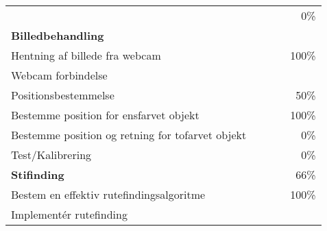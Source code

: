 \begin{footnotesize}
\begin{center}
\begin{tabular}{l | l | r r r}
																&		&		& 		& 0\%\\				
	\hspace*{0.3cm}\hspace*{0.3cm} \textbf{Billedbehandling}
																&		&		& 		& \\
	\hspace*{0.3cm}\hspace*{0.3cm}\hspace*{0.3cm} Hentning af billede fra webcam
																&		&		& 		&100\% \\	
	\hspace*{0.3cm}\hspace*{0.3cm}\hspace*{0.3cm} Webcam forbindelse
																&		&		& 		& \\
	\hspace*{0.3cm}\hspace*{0.3cm}\hspace*{0.3cm} Positionsbestemmelse
																&		&		& 		&50\% \\
	\hspace*{0.3cm}\hspace*{0.3cm}\hspace*{0.3cm}\hspace*{0.3cm} Bestemme position for ensfarvet objekt
																&		&		& 		&100\% \\
	\hspace*{0.3cm}\hspace*{0.3cm}\hspace*{0.3cm}\hspace*{0.3cm} Bestemme position og retning for tofarvet objekt
																&		&		& 		&0\% \\
	\hspace*{0.3cm}\hspace*{0.3cm}\hspace*{0.3cm} Test/Kalibrering
																&		&		& 		&0\% \\
	\hspace*{0.3cm}\hspace*{0.3cm} \textbf{Stifinding}
																&		&		& 		&66\% \\
	\hspace*{0.3cm}\hspace*{0.3cm}\hspace*{0.3cm} Bestem en effektiv rutefindingsalgoritme
																&		&		& 		& 100\%\\
	\hspace*{0.3cm}\hspace*{0.3cm}\hspace*{0.3cm} Implementér rutefinding

\end{tabular}
\end{center}
\end{footnotesize}
